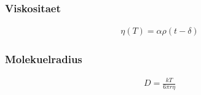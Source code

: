 \subsubsection{Viskositaet}%
\label{sub:viskositaet}

\begin{align}
  \label{eq:viskositaet}
  \eta \left(T\right) = \alpha \rho \left(t - \delta\right)
\end{align}

\subsubsection{Molekuelradius}%
\label{sub:molekuelradius}

\begin{align}
  \label{eq:molekuelradius}
  D = \frac{k T}{6 \pi r \eta}
\end{align}




